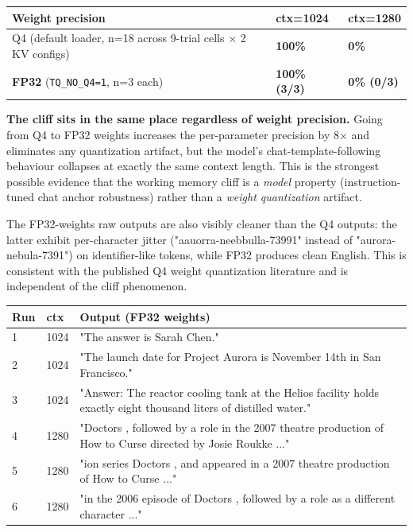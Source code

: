\documentclass[11pt]{article}
\begin{document}
\begin{center}
\begin{tabular}{lll}
\toprule
Weight precision & ctx=1024 & ctx=1280 \\
\midrule
Q4 (default loader, n=18 across 9-trial cells × 2 KV configs) & \textbf{100\%} & \textbf{0\%} \\
\textbf{FP32} (\texttt{TQ\_NO\_Q4=1}, n=3 each) & \textbf{100\% (3/3)} & \textbf{0\% (0/3)} \\
\bottomrule
\end{tabular}
\end{center}


\textbf{The cliff sits in the same place regardless of weight precision.} Going from Q4 to FP32 weights increases the per-parameter precision by 8× and eliminates any quantization artifact, but the model's chat-template-following behaviour collapses at exactly the same context length. This is the strongest possible evidence that the working memory cliff is a \textit{model} property (instruction-tuned chat anchor robustness) rather than a \textit{weight quantization} artifact.


The FP32-weights raw outputs are also visibly cleaner than the Q4 outputs: the latter exhibit per-character jitter ("aauorra-neebbulla-73991" instead of "aurora-nebula-7391") on identifier-like tokens, while FP32 produces clean English. This is consistent with the published Q4 weight quantization literature and is independent of the cliff phenomenon.


\begin{center}
\begin{tabular}{lll}
\toprule
Run & ctx & Output (FP32 weights) \\
\midrule
1 & 1024 & "The answer is Sarah Chen." \\
2 & 1024 & "The launch date for Project Aurora is November 14th in San Francisco." \\
3 & 1024 & "Answer: The reactor cooling tank at the Helios facility holds exactly eight thousand liters of distilled water." \\
4 & 1280 & "Doctors , followed by a role in the 2007 theatre production of How to Curse directed by Josie Roukke ..." \\
5 & 1280 & "ion series Doctors , and appeared in a 2007 theatre production of How to Curse ..." \\
6 & 1280 & "in the 2006 episode of Doctors , followed by a role as a different character ..." \\
\bottomrule
\end{tabular}
\end{center}
\end{document}
